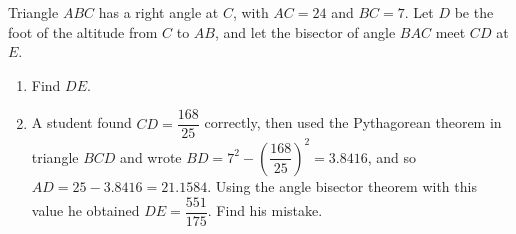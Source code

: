 Triangle $ABC$ has a right angle at $C$, with $AC=24$ and $BC=7$. Let $D$ be the foot of the altitude from $C$ to $AB$, and let the bisector of angle $BAC$ meet $CD$ at $E$.
\begin{enumerate}
\item[(a)] Find $DE$.
\item[(b)] A student found $CD=\dfrac{168}{25}$ correctly, then used the Pythagorean theorem in triangle $BCD$ and wrote $BD=7^2-\left(\dfrac{168}{25}\right)^2=3.8416$, and so $AD=25-3.8416=21.1584$. Using the angle bisector theorem with this value he obtained $DE=\dfrac{551}{175}$. Find his mistake.
\end{enumerate}
